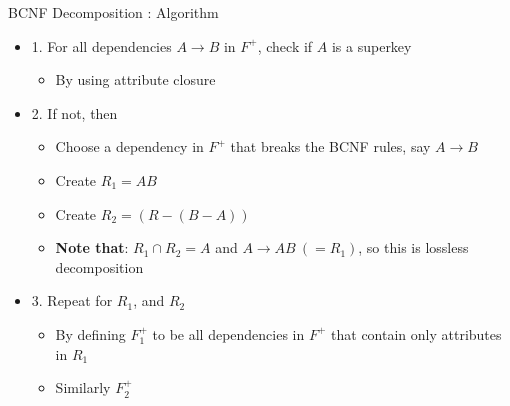 \documentclass[aspectratio=169, xcolor=dvipsnames]{beamer}
\begin{document}
\begin{frame}{BCNF Decomposition : Algorithm}
    \begin{itemize}[<+->]
        \item 1. For all dependencies $A \rightarrow B$ in $F^+$, check if $A$ is a superkey
        \begin{itemize}
            \item[$\triangleright$] By using attribute closure
        \end{itemize}
        \item 2. If not, then
        \begin{itemize}
            \item[$\triangleright$] Choose a dependency in $F^+$ that breaks the BCNF rules, say $A \rightarrow B$
            \item[$\triangleright$] Create $R_1 = AB$
            \item[$\triangleright$] Create $R_2 = (R - (B - A))$
            \item[$\triangleright$] \textbf{Note that}: $R_1 \cap R_2 = A$ and $A \rightarrow AB\ (= R_1)$, so this is lossless decomposition
        \end{itemize}
        \item 3. Repeat for $R_1$, and $R_2$
        \begin{itemize}
            \item[$\triangleright$] By defining $F_1^+$ to be all dependencies in $F^+$ that contain only attributes in $R_1$
            \item[$\triangleright$] Similarly $F_2^+$
        \end{itemize}
    \end{itemize}
\end{frame}
\end{document}
